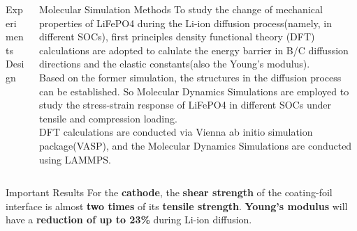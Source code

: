 \documentclass[final]{beamer}
\newlength{\onecolwid}
\newlength{\twocolwid}
\begin{document}
\begin{frame}[t]
\begin{columns}[t]
\begin{column}{\twocolwid}
\begin{columns}[t,totalwidth=\twocolwid]
\begin{column}{\onecolwid}
\begin{block}{Experiments Design}
\end{block}


\end{column} %

\begin{column}{\onecolwid}\vspace{-.6in} %


\begin{block}{Molecular Simulation Methods}
To study the change of mechanical properties of LiFePO4 during the Li-ion diffusion process(namely, in different SOCs), first principles density functional theory (DFT) calculations are adopted to calulate the energy barrier in B/C diffussion directions and the elastic constants(also the Young's modulus). \\
Based on the former simulation, the structures in the diffusion process can be established. So Molecular Dynamics Simulations are employed to study the stress-strain response of LiFePO4 in different SOCs under tensile and compression loading.\\
DFT calculations are conducted via Vienna ab initio simulation package\cite{Kresse1996Efficient}(VASP), and the Molecular Dynamics Simulations are conducted using LAMMPS\cite{Plimpton1995Fast}.
\end{block}


\end{column} %

\end{columns} %

\begin{alertblock}{Important Results}
For the \textbf{cathode}, the \textbf{shear strength} of
the coating-foil interface is almost \textbf{two times} of its \textbf{tensile
strength}. 
\textbf{Young's modulus} will have a \textbf{reduction of up to 23\%} during Li-ion diffusion.
\end{alertblock} 


\end{column}
\end{columns}
\end{frame}
\end{document}
